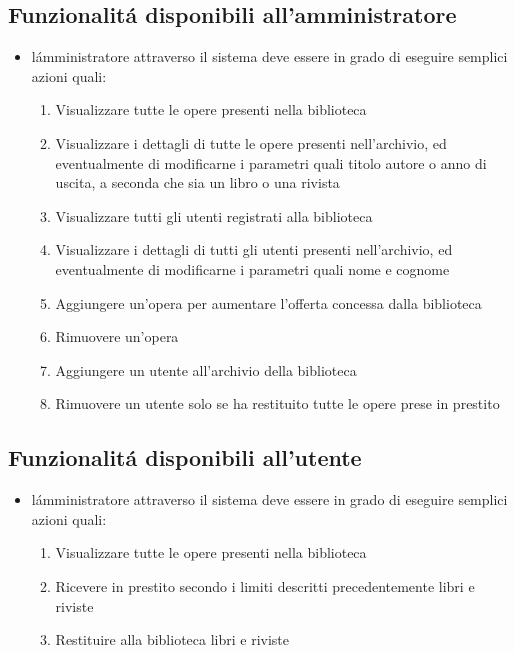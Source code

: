 \documentclass[10pt]{article}
\begin{document}
\subsection{Funzionalit\'a disponibili all'amministratore}
\begin{itemize}
\item l\'amministratore attraverso il sistema deve essere in grado di eseguire semplici azioni quali:
		\begin{enumerate}
		\item Visualizzare tutte le opere presenti nella biblioteca
		\item Visualizzare i dettagli di tutte le opere presenti nell'archivio, ed eventualmente di modificarne i parametri quali titolo autore o anno di uscita, a 					seconda che sia un libro o una rivista
		\item Visualizzare tutti gli utenti registrati alla biblioteca
		\item Visualizzare i dettagli di tutti gli utenti presenti nell'archivio, ed eventualmente di modificarne i parametri quali nome e cognome
		\item Aggiungere un'opera per aumentare l'offerta concessa dalla biblioteca
		\item Rimuovere un'opera 
		\item Aggiungere un utente all'archivio della biblioteca
		\item Rimuovere un utente solo se ha restituito tutte le opere prese in prestito
		\end{enumerate}
\end{itemize}

\subsection{Funzionalit\'a disponibili all'utente}
\begin{itemize}
\item l\'amministratore attraverso il sistema deve essere in grado di eseguire semplici azioni quali:
		\begin{enumerate}
		\item Visualizzare tutte le opere presenti nella biblioteca
		\item Ricevere in prestito secondo i limiti descritti precedentemente libri e riviste
		\item Restituire alla biblioteca libri e riviste
		\end{enumerate}
\end{itemize}
\end{document}
